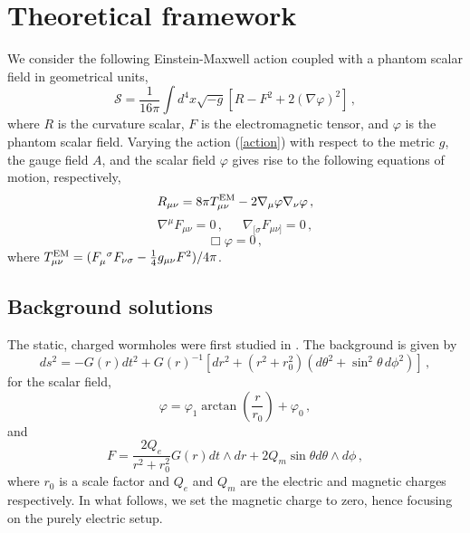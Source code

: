 \documentclass[11pt,a4paper]{article}
\begin{document}
\section{Theoretical framework}
\label{sec:TheoreticalFramework}

We consider the following Einstein-Maxwell action coupled with a phantom scalar field in geometrical units,
\begin{equation}
    \mathcal{S}=\frac{1}{16\pi}\int d^4x\sqrt{-g}\left[R-F^2+2(\nabla\varphi)^2\right] \, ,
    \label{action}
\end{equation}
where $R$ is the curvature scalar, $F$ is the electromagnetic tensor, and $\varphi$ is the phantom scalar field. 
Varying the action (\ref{action}) with respect to the metric $g$, the gauge field $A$, and the scalar field $\varphi$ gives rise to
the following equations of motion, respectively,
\begin{equation}\label{Einstein_eqs}
    R_{\mu\nu}=8\pi T^{\rm{EM}}_{\mu\nu}-2\nabla_{\mu}\varphi\nabla_{\nu}\varphi \, ,
\end{equation}
\begin{equation}\label{Maxwell_eqs}
    \nabla^{\mu}F_{\mu\nu}=0 \, , \,\,\,\,\,\,\,\,\, \nabla_{[\sigma}F_{\mu\nu]}=0 \, ,
\end{equation}
\begin{equation}\label{scalar_field_eq}
    \Box\varphi=0\, ,
\end{equation}
where $T^{\rm{EM}}_{\mu\nu}=(F_{\mu}^{\,\,\,\sigma}F_{\nu\sigma}-\frac{1}{4}g_{\mu\nu}F^2)/4\pi$. 


\subsection{Background solutions}


The static, charged wormholes were first studied in \cite{Gonzalez:2009hn}.
The background is given by
%
\begin{equation}\label{metric_b}
    ds^2=-G(r)dt^2+G(r)^{-1}\left[dr^2+(r^2+r_0^2)(d\theta^2+\sin^2{\theta}\,d\phi^2)\right]\, ,
\end{equation}
%
for the scalar field,
\begin{equation}\label{scalar_b}
    \varphi=\varphi_1\arctan{\left(\frac{r}{r_0}\right)}+\varphi_0 \, ,
\end{equation}
%
and 
%
\begin{equation}\label{F_exp}
    F=\frac{2Q_e}{r^2+r_0^2}G(r)dt\wedge dr+2Q_m\sin{\theta}d\theta\wedge d\phi\, ,
\end{equation}
%
where $r_0$ is a scale factor and $Q_e$ and $Q_m$ are the electric and magnetic charges respectively.
In what follows, we set the magnetic charge  to zero, hence focusing on the purely electric setup.
\end{document}
